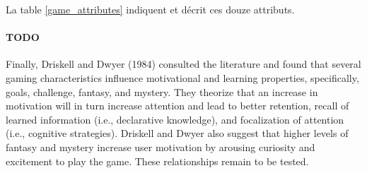 La table \ref{game_attributes} indiquent et décrit ces douze attributs.

\paragraph{TODO}
Finally, Driskell and Dwyer (1984) consulted the literature and found that several
gaming characteristics influence motivational and learning properties, specifically,
goals, challenge, fantasy, and mystery. They theorize that an increase in motivation
will in turn increase attention and lead to better retention, recall of learned information
(i.e., declarative knowledge), and focalization of attention (i.e., cognitive strategies).
Driskell and Dwyer also suggest that higher levels of fantasy and mystery
increase user motivation by arousing curiosity and excitement to play the game.
These relationships remain to be tested.

